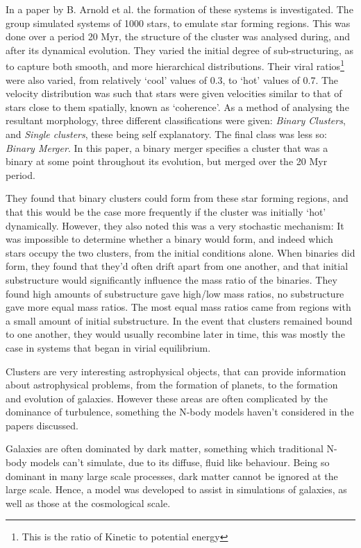 \documentclass[a4paper,10pt]{article}
\begin{document}
In a paper by B. Arnold et al. the formation of these systems is investigated\cite{ClusterBinary}. The group simulated systems of 1000 stars, to emulate star forming regions. This was done over a period 20 Myr, the structure of the cluster was analysed during, and after its dynamical evolution. They varied the initial degree of sub-structuring, as to capture both smooth, and more hierarchical distributions. Their viral ratios\footnote{This is the ratio of Kinetic to potential energy} were also varied, from relatively `cool' values of 0.3, to `hot' values of 0.7. The velocity distribution was such that stars were given velocities similar to that of stars close to them spatially, known as `coherence'. As a method of analysing the resultant morphology, three different classifications were given: \textit{Binary Clusters}, and \textit{Single clusters}, these being self explanatory. The final class was less so: \textit{Binary Merger}. In this paper, a binary merger specifies a cluster that was a binary at some point throughout its evolution, but merged over the 20 Myr period.

They found that binary clusters could form from these star forming regions, and that this would be the case more frequently if the cluster was initially `hot' dynamically. However, they also noted this was a very stochastic mechanism: It was impossible to determine whether a binary would form, and indeed which stars occupy the two clusters, from the initial conditions alone. When binaries did form, they found that they'd often drift apart from one another, and that initial substructure would significantly influence the mass ratio of the binaries. They found high amounts of substructure gave high/low mass ratios, no substructure gave more equal mass ratios. The most equal mass ratios came from regions with a small amount of initial substructure. In the event that clusters remained bound to one another, they would usually recombine later in time, this was mostly the case in systems that began in virial equilibrium.

Clusters are very interesting astrophysical objects, that can provide information about astrophysical problems, from the formation of planets, to the formation and evolution of galaxies. However these areas are often complicated by the dominance of turbulence, something the N-body models haven't considered in the papers discussed.

Galaxies are often dominated by dark matter, something which traditional N-body models can't simulate, due to its diffuse, fluid like behaviour. Being so dominant in many large scale processes, dark matter cannot be ignored at the large scale. Hence, a model was developed to assist in simulations of galaxies, as well as those at the cosmological scale. 
\end{document}
